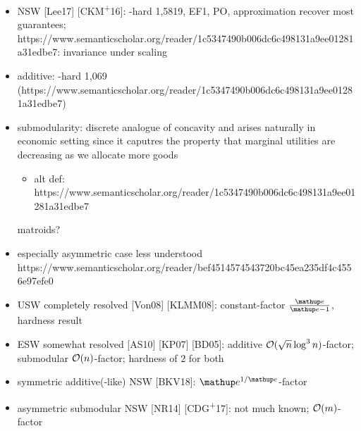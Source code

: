\begin{itemize}


	\item
	NSW [Lee17] [CKM\textsuperscript{+}16]:
	\NP-hard 1,5819, EF1, PO, approximation recover most guarantees;
	https://www.semanticscholar.org/reader/1c5347490b006dc6c498131a9ee01281a31edbe7:
	invariance under scaling

	\item
	additive:
	\NP-hard 1,069 (https://www.semanticscholar.org/reader/1c5347490b006dc6c498131a9ee01281a31edbe7)

	\item
	submodularity:
	discrete analogue of concavity and arises naturally in economic setting since it caputres the property that marginal utilities are decreasing as we allocate more goods
	\begin{itemize}
		\item
		alt def: https://www.semanticscholar.org/reader/1c5347490b006dc6c498131a9ee01281a31edbe7
	\end{itemize}
	matroids?


	\item
	especially asymmetric case less understood
	https://www.semanticscholar.org/reader/bef4514574543720bc45ea235df4c4556e97efe0

	\item
	USW completely resolved [Von08] [KLMM08]:
	constant-factor \(\frac{\euler}{\euler - 1}\), hardness result

	\item
	ESW somewhat resolved [AS10] [KP07] [BD05]:
	additive \(\mathcal{O}(\sqrt{n} \log^3 n)\)-factor;
	submodular \(\mathcal{O}(n)\)-factor;
	hardness of \(2\) for both

	\item
	symmetric additive(-like) NSW [BKV18]:
	\(\euler^{1/\euler}\)-factor

	\item
	asymmetric submodular NSW [NR14] [CDG\textsuperscript{+}17]:
	not much known;
	\(\mathcal{O}(m)\)-factor


\end{itemize}
